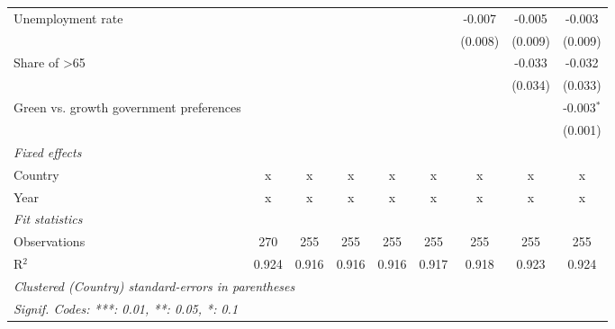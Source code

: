 \begin{table}[htbp]
\begin{tabular}{lcccccccc}
      Unemployment rate                                           &         &         &         &         &         & -0.007  & -0.005  & -0.003\\   
                                                                  &         &         &         &         &         & (0.008) & (0.009) & (0.009)\\   
      Share of >65                                                &         &         &         &         &         &         & -0.033  & -0.032\\   
                                                                  &         &         &         &         &         &         & (0.034) & (0.033)\\   
      Green vs. growth government preferences                     &         &         &         &         &         &         &         & -0.003$^{*}$\\   
                                                                  &         &         &         &         &         &         &         & (0.001)\\   
      \emph{Fixed effects}\\
      Country                                                     & x       & x       & x       & x       & x       & x       & x       & x\\  
      Year                                                        & x       & x       & x       & x       & x       & x       & x       & x\\  
      \midrule \emph{Fit statistics}\\
      Observations                                                & 270     & 255     & 255     & 255     & 255     & 255     & 255     & 255\\  
      R$^2$                                                       & 0.924   & 0.916   & 0.916   & 0.916   & 0.917   & 0.918   & 0.923   & 0.924\\  
      \midrule
      \multicolumn{9}{l}{\emph{Clustered (Country) standard-errors in parentheses}}\\
      \multicolumn{9}{l}{\emph{Signif. Codes: ***: 0.01, **: 0.05, *: 0.1}}\\
   \end{tabular}
\end{table}


